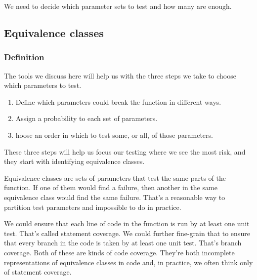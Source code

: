 \documentclass[fleqn,10pt]{olplainarticle}
\begin{document}
We need to decide which parameter sets to test
and how many are enough.

\subsection{Equivalence classes}\label{sec:limits}

\subsubsection{Definition}
% 

The tools we discuss here will help us with the three steps
we take to choose which parameters to test.

\begin{enumerate}
  \item Define which parameters could break the function in different ways.

  \item Assign a probability to each set of parameters.

  \item hoose an order in which to test some, or all, of those
   parameters.
\end{enumerate}

\noindent{}These three steps will help us focus our testing
where we see the most risk, and they start with identifying
equivalence classes.

Equivalence classes are sets of parameters that test the same
parts of the function. If one of them would find a failure,
then another in the same equivalence class would find the same
failure. That's a reasonable way to partition test parameters
and impossible to do in practice.

We could ensure that each line of code in the function is
run by at least one unit test. That's called statement coverage.
We could further fine-grain that to ensure that every branch
in the code is taken by at least one unit test. That's
branch coverage. Both of these are kinds of code coverage.
They're both incomplete representations of equivalence classes
in code and, in practice, we often think only of statement
coverage.
\end{document}
